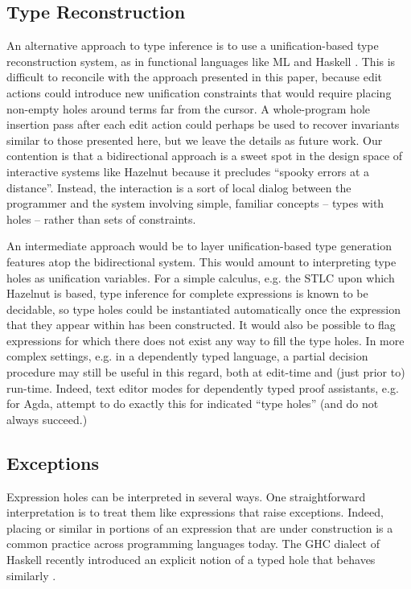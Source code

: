 \documentclass[9pt]{sigplanconf}
\begin{document}
\subsection{Type Reconstruction}
An alternative approach to type inference is to use a unification-based type reconstruction system, as in functional languages like ML and Haskell \cite{damas1982principal}. This is difficult to reconcile with the approach presented in this paper, because edit actions could introduce new  unification constraints that would require placing non-empty holes around terms far from the cursor.  A whole-program hole insertion pass after each edit action could perhaps be used to recover invariants similar to those presented here, but we leave the details as future work. Our contention is that a bidirectional approach is a sweet spot in the design space of interactive systems like Hazelnut because it precludes
``spooky errors at a distance''. Instead, the interaction is a sort of local
dialog between the programmer and the system involving simple, familiar
concepts -- types with holes -- rather than sets of constraints.


An intermediate approach would be to 
layer unification-based type generation features atop the bidirectional system. This would amount to  interpreting type holes as unification
variables. For a simple calculus,
e.g. the STLC upon which Hazelnut is based, type inference for complete expressions is known to be
decidable, so type holes could be instantiated automatically once the expression that they appear within has been constructed. It would also be possible to flag expressions for which there does not exist any way to fill the type holes. In more complex settings, e.g. in a 
dependently typed language, a partial decision procedure may still be
useful in this regard, both at edit-time and (just prior to)
run-time. Indeed, text editor modes for dependently typed proof assistants, e.g. for Agda,
attempt to do exactly this for indicated ``type holes'' (and do not always
succeed.)

\subsection{Exceptions}
Expression holes can be interpreted in several
ways. One straightforward interpretation is to treat them 
like expressions that raise exceptions. Indeed,
placing  or similar in portions of an expression
that are under construction is a common practice across programming
languages today. The GHC dialect of Haskell recently introduced an explicit notion of a 
typed hole that behaves similarly \cite{GHC/holes}. 
\end{document}
